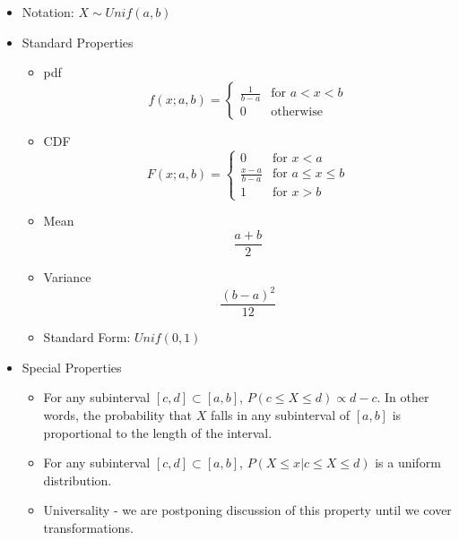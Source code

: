 \documentclass[12pt]{article} %
\begin{document}
\begin{itemize}
\item Notation: $X\sim Unif(a,b)$

\item Standard Properties

\begin{minipage}{3in}
\begin{itemize}[label=$\star$]
\item pdf $$f(x;a,b) = \left\{\begin{matrix}
\frac{1}{b-a}& \textrm{for } a<x<b\\ 0&\textrm {otherwise}
\end{matrix}\right.$$
\item CDF $$F(x;a,b) = \left\{\begin{matrix}
0&\textrm{for } x<a\\ \frac{x-a}{b-a} & \textrm{for } a\leq x\leq b\\1&\textrm{for } x>b
\end{matrix}\right.$$
\end{itemize}
\end{minipage}
\hspace{1in}
\begin{minipage}{3in}
\begin{itemize}[label=$\star$]
\item Mean $$\frac{a+b}2$$
\item Variance $$\frac{(b-a)^2}{12}$$
\item Standard Form: $Unif(0,1)$
\end{itemize}
\end{minipage}
\item Special Properties
\begin{itemize}[label=$\star$]
\item For any subinterval $[c,d]\subset [a,b]$, $P(c\leq X\leq d) \propto d-c$. In other words, the probability that $X$ falls in any subinterval of $[a,b]$ is proportional to the length of the interval.
\item For any subinterval $[c,d]\subset [a,b]$, $P(X\leq x|c\leq X\leq d)$ is a uniform distribution.
\item Universality - we are postponing discussion of this property until we cover transformations.
\end{itemize}

\end{itemize}
\end{document}
